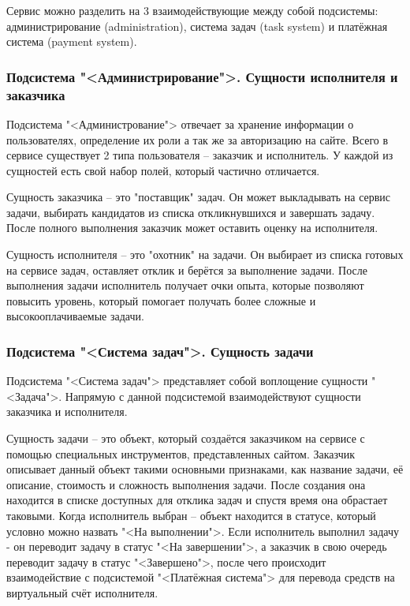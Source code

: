 Сервис можно разделить на 3 взаимодействующие между собой подсистемы: администрирование (administration), система задач (task system) и платёжная система (payment system).

\subsubsection{Подсистема "<Администрирование">. Сущности исполнителя и заказчика}

Подсистема "<Администрование"> отвечает за хранение информации о пользователях, определение их роли а так же за авторизацию на сайте. Всего в сервисе существует 2 типа пользователя -- заказчик и исполнитель. У каждой из сущностей есть свой набор полей, который частично отличается. 

Сущность заказчика -- это "поставщик" задач. Он может выкладывать на сервис задачи, выбирать кандидатов из списка откликнувшихся и завершать задачу. После полного выполнения заказчик может оставить оценку на исполнителя.

Сущность исполнителя -- это "охотник" на задачи. Он выбирает из списка готовых на сервисе задач, оставляет отклик и берётся за выполнение задачи. После выполнения задачи исполнитель получает очки опыта, которые позволяют повысить уровень, который помогает получать более сложные и высокооплачиваемые задачи.

\subsubsection{Подсистема "<Система задач">. Сущность задачи}

Подсистема "<Система задач"> представляет собой воплощение сущности "<Задача">. Напрямую с данной подсистемой взаимодействуют сущности заказчика и исполнителя.

Сущность задачи -- это объект, который создаётся заказчиком на сервисе с помощью специальных инструментов, представленных сайтом. Заказчик описывает данный объект такими основными признаками, как название задачи, её описание, стоимость и сложность выполнения задачи. После создания она находится в списке доступных для отклика задач и спустя время она обрастает таковыми. Когда исполнитель выбран -- объект находится в статусе, который условно можно назвать "<На выполнении">. Если исполнитель выполнил задачу - он переводит задачу в статус "<На завершении">, а заказчик в свою очередь переводит задачу в статус "<Завершено">, после чего происходит взаимодействие с подсистемой "<Платёжная система"> для перевода средств на виртуальный счёт исполнителя.

